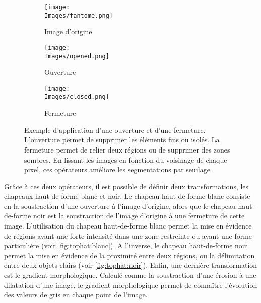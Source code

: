 \documentclass[\main/main.tex]{subfiles}
\providecommand{\Images}{\main/Figures/intro_seg}
\begin{document}
\begin{figure}[h]
    \centering
    \begin{subfigure}[b]{0.30\textwidth}
       \caption{
       Image d'origine
            }
       \centering \texttt{[image: \\Images/fantome.png]}
    \end{subfigure}
    \begin{subfigure}[b]{0.30\textwidth}
       \caption{
        \label{fig:ouverture}
            Ouverture
            }
       \centering \texttt{[image: \\Images/opened.png]}
    \end{subfigure}
    \begin{subfigure}[b]{0.30\textwidth}
       \caption{
        \label{fig:fermeture}
            Fermeture
            }
       \centering \texttt{[image: \\Images/closed.png]}
    \end{subfigure}
    \caption{
        Exemple d'application d'une ouverture et d'une fermeture.
        \newline
        L'ouverture permet de supprimer les éléments fins ou isolés.
        La fermeture permet de relier deux régions ou de supprimer des zones sombres.
        En lissant les images en fonction du voisinage de chaque pixel, ces opérateurs améliore les segmentations par seuilage
    }
    
\end{figure}
%
Grâce à ces deux opérateurs, il est possible de définir deux transformations, les chapeaux haut-de-forme blanc et noir.
%
Le chapeau haut-de-forme blanc consiste en la soustraction d'une ouverture à l'image d'origine, alors que le chapeau haut-de-forme noir est la soustraction de l'image d'origine à une fermeture de cette image.
%
L'utilisation du chapeau haut-de-forme blanc permet la mise en évidence de régions ayant une forte intensité dans une zone restreinte ou ayant une forme particulière (voir \autoref{fig:tophat:blanc}).
%
A l'inverse, le chapeau haut-de-forme noir permet la mise en évidence de la proximité entre deux régions, ou la délimitation entre deux objets clairs (voir \autoref{fig:tophat:noir}).
%
Enfin, une dernière transformation est le gradient morphologique.
%
Calculé comme la soustraction d'une érosion à une dilatation d'une image,
le gradient morphologique permet de connaître l'évolution des valeurs de gris en chaque point de l'image.
\end{document}
